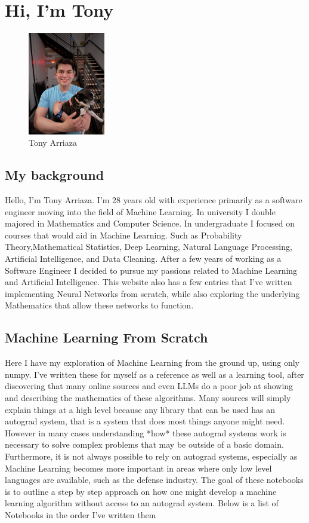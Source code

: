 \documentclass{article}
\begin{document}
\section*{Hi, I'm Tony}
\begin{figure}[h]
    \centering
    \includegraphics[width=0.3\textwidth]{static/images/myself.png}
    \caption{Tony Arriaza}
\end{figure}

\subsection*{ My background}

Hello, I'm Tony Arriaza. I'm 28 years old with experience primarily as a software engineer moving into the field of Machine Learning. In university I double majored in Mathematics and Computer Science. In undergraduate I focused on courses that would aid in Machine Learning. Such as Probability Theory,Mathematical Statistics, Deep Learning, Natural Language Processing, Artificial Intelligence, and Data Cleaning. After a few years of working as a Software Engineer I decided to pursue my passions related to Machine Learning and Artificial Intelligence. This website also has a few entries that I've written implementing Neural Networks from scratch, while also exploring the underlying Mathematics that allow these networks to function. 

\subsection*{Machine Learning From Scratch}

Here I have my exploration of Machine Learning from the ground up, using only numpy. I've written these for myself as a reference as well as a learning tool, after discovering that many online sources and even LLMs do a poor job at showing and describing the mathematics of these algorithms. Many sources will simply explain things at a high level because any library that can be used has an autograd system, that is a system that does most things anyone might need. However in many cases understanding *how* these autograd systems work is necessary to solve complex problems that may be outside of a basic domain. Furthermore, it is not always possible to rely on autograd systems, especially as Machine Learning becomes more important in areas where only low level languages are available, such as the defense industry. The goal of these notebooks is to outline a step by step approach on how one might develop a machine learning algorithm without access to an autograd system. Below is a list of Notebooks in the order I've written them
\end{document}
